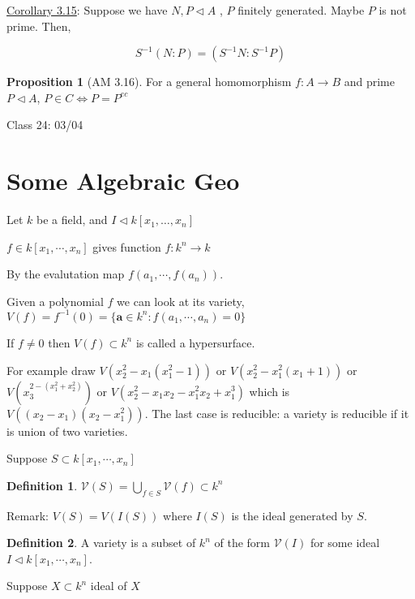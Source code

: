 \documentclass{article}
\theoremstyle{definition}
\newtheorem{definition}{Definition}
\newtheorem{proposition}{Proposition}
\begin{document}
\underline{Corollary 3.15}: Suppose we have \(N,P \triangleleft A\) , \(P\) finitely generated. Maybe \(P\) is not prime. Then,

\[
    S ^{-1} (N : P) = (S ^{-1} N : S ^{-1} P)
\]

\begin{proposition}
    [AM 3.16]

    For a general homomorphism \(f:A \to B\) and prime \(P \triangleleft A\), \(P\in C \iff P = P^{ec}\)
\end{proposition}

\hrulefill

Class 24: 03/04

\section*{Some Algebraic Geo}

Let \(k\) be a field, and \(I \triangleleft k[x_1, \dots , x_n]\) 

\(f\in k[x_1,\cdots, x_n]\) gives function \(f: k^n \to k\)

By the evalutation map \(f(a_1,\cdots, f(a_n))\).

Given a polynomial \(f\) we can look at its variety, \(V(f)= f^{-1}(0) = \{\mathbf a\in k^n : f(a_1,\cdots,a_n) = 0 \} \) 

If \(f\neq 0\) then \(V(f) \subset k^n\) is called a hypersurface.

For example draw \(V(x_2^2 - x_1(x_1^2 - 1))\) or \(V(x_2^2 - x_1^2(x_1 + 1) )\)  or \(V(x_3^{2-(x_1^2 +x_2^2 )} )\) or \(V(x_2^2 - x_1 x_2 - x_1^2 x_2 + x_1^3)\) which is \(V((x_2 - x_1)(x_2 - x_1^2))\). The last case is reducible: a variety is reducible if it is union of two varieties.

Suppose \(S \subset k[x_1,\cdots,x_n]\) 

\begin{definition}
    \(\mathcal{V} (S) = \bigcup_{f\in S}^{} \mathcal{V} (f) \subset k^n\) 
\end{definition}

Remark: \(V(S) = V(I(S))\) where \(I(S)\) is the ideal generated by \(S\).

\begin{definition}
    A variety is a subset of \(k^n\) of the form \(\mathcal{V}(I)\) for some ideal \(I \triangleleft k[x_1,\cdots, x_n]\).
\end{definition}

Suppose \(X \subset k^n\) ideal of \(X\) 
\end{document}
